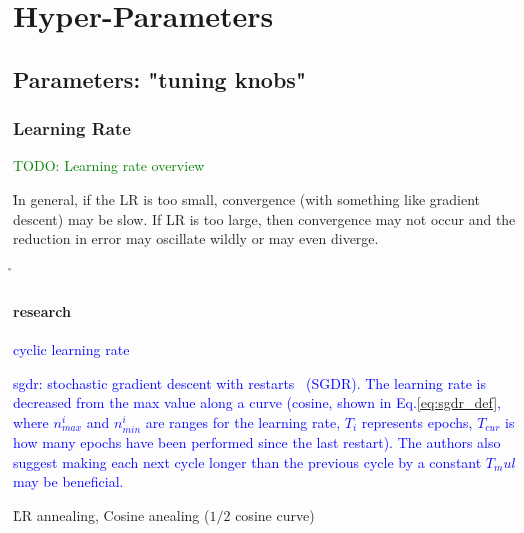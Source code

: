 \section{Hyper-Parameters}

\subsection{Parameters: "tuning knobs"}

\subsubsection{Learning Rate}

\textcolor{green}{TODO: Learning rate overview}




\r{In general, if the LR is too small, convergence (with something like gradient descent) may be slow.  If LR is too large, then convergence may not occur and the reduction in error may oscillate wildly or may even diverge.}


\r{}


\paragraph{research}


\textcolor{blue}{cyclic learning rate~\cite{smith2017cyclical}}

\textcolor{blue}{sgdr: stochastic gradient descent with restarts~\cite{loshchilov2016sgdr} (SGDR). The learning rate is decreased from the max value along a curve (cosine, shown in Eq.\ref{eq:sgdr_def}, where $n_{max}^i$ and $n_{min}^i$ are ranges for the learning rate, $T_i$ represents epochs, $T_{cur}$ is how many epochs have been performed since the last restart). The authors also suggest making each next cycle longer than the previous cycle by a constant $T_mul$ may be beneficial.}

\r{LR annealing, Cosine anealing ($1/2$ cosine curve)}


